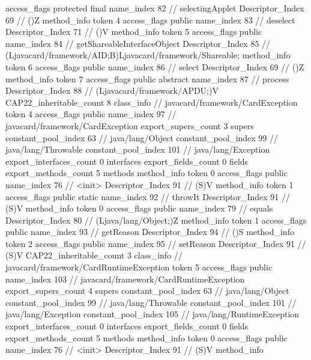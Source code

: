 {{{{{					access_flags	protected final
					name_index	82		// selectingApplet
					Descriptor_Index	69		// ()Z
				}
				method_info {
					token	4
					access_flags	public
					name_index	83		// deselect
					Descriptor_Index	71		// ()V
				}
				method_info {
					token	5
					access_flags	public
					name_index	84		// getShareableInterfaceObject
					Descriptor_Index	85		// (Ljavacard/framework/AID;B)Ljavacard/framework/Shareable;
				}
				method_info {
					token	6
					access_flags	public
					name_index	86		// select
					Descriptor_Index	69		// ()Z
				}
				method_info {
					token	7
					access_flags	public abstract
					name_index	87		// process
					Descriptor_Index	88		// (Ljavacard/framework/APDU;)V
				}
			}
			CAP22_inheritable_count	8
		}
		class_info {		// javacard/framework/CardException
			token	4
			access_flags	public
			name_index	97		// javacard/framework/CardException
			export_supers_count	3
			supers {
				constant_pool_index	63		// java/lang/Object
				constant_pool_index	99		// java/lang/Throwable
				constant_pool_index	101		// java/lang/Exception
			}
			export_interfaces_count	0
			interfaces {
			}
			export_fields_count	0
			fields {
			}
			export_methods_count	5
			methods {
				method_info {
					token	0
					access_flags	public
					name_index	76		// <init>
					Descriptor_Index	91		// (S)V
				}
				method_info {
					token	1
					access_flags	public static
					name_index	92		// throwIt
					Descriptor_Index	91		// (S)V
				}
				method_info {
					token	0
					access_flags	public
					name_index	79		// equals
					Descriptor_Index	80		// (Ljava/lang/Object;)Z
				}
				method_info {
					token	1
					access_flags	public
					name_index	93		// getReason
					Descriptor_Index	94		// ()S
				}
				method_info {
					token	2
					access_flags	public
					name_index	95		// setReason
					Descriptor_Index	91		// (S)V
				}
			}
			CAP22_inheritable_count	3
		}
		class_info {		// javacard/framework/CardRuntimeException
			token	5
			access_flags	public
			name_index	103		// javacard/framework/CardRuntimeException
			export_supers_count	4
			supers {
				constant_pool_index	63		// java/lang/Object
				constant_pool_index	99		// java/lang/Throwable
				constant_pool_index	101		// java/lang/Exception
				constant_pool_index	105		// java/lang/RuntimeException
			}
			export_interfaces_count	0
			interfaces {
			}
			export_fields_count	0
			fields {
			}
			export_methods_count	5
			methods {
				method_info {
					token	0
					access_flags	public
					name_index	76		// <init>
					Descriptor_Index	91		// (S)V
				}
				method_info {
}}}}}
